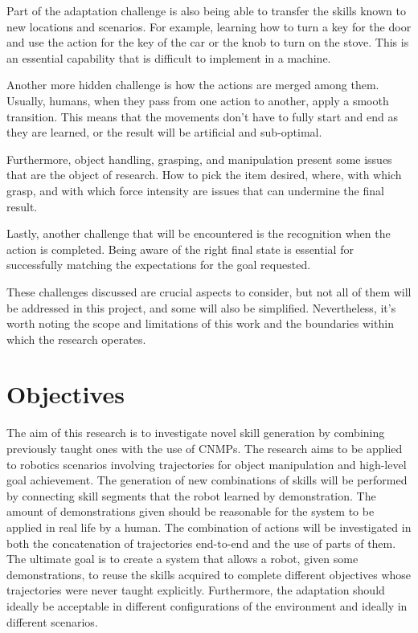 Part of the adaptation challenge is also being able to transfer the skills known to new locations and scenarios. For example, learning how to turn a key for the door and use the action for the key of the car or the knob to turn on the stove. This is an essential capability that is difficult to implement in a machine.   

Another more hidden challenge is how the actions are merged among them. Usually, humans, when they pass from one action to another, apply a smooth transition. This means that the movements don't have to fully start and end as they are learned, or the result will be artificial and sub-optimal.   

Furthermore, object handling, grasping, and manipulation present some issues that are the object of research. How to pick the item desired, where,  with which grasp, and with which force intensity are issues that can undermine the final result.

Lastly, another challenge that will be encountered is the recognition when the action is completed. Being aware of the right final state is essential for successfully matching the expectations for the goal requested. 

These challenges discussed are crucial aspects to consider, but not all of them will be addressed in this project, and some will also be simplified. Nevertheless, it's worth noting the scope and limitations of this work and the boundaries within which the research operates.

\section{Objectives}
The aim of this research is to investigate novel skill generation by combining previously taught ones with the use of CNMPs. 
The research aims to be applied to robotics scenarios involving trajectories for object manipulation and high-level goal achievement. 
The generation of new combinations of skills will be performed by connecting skill segments that the robot learned by demonstration. The amount of demonstrations given should be reasonable for the system to be applied in real life by a human. 
The combination of actions will be investigated in both the concatenation of trajectories end-to-end and the use of parts of them. 
The ultimate goal is to create a system that allows a robot, given some demonstrations, to reuse the skills acquired to complete different objectives whose trajectories were never taught explicitly. Furthermore, the adaptation should ideally be acceptable in different configurations of the environment and ideally in different scenarios.


